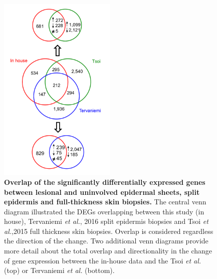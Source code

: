 \begin{figure}[htbp]
\centering
\includegraphics[width=0.5\textwidth]{./Results2/pdfs/skin_transcriptomics_venn_diagrams}
\caption[Overlap of the significantly differentially expressed genes between lesional and uninvolved epidermal sheets, split epidermis and whole skin biopsies.]{\textbf{Overlap of the significantly differentially expressed genes between lesional and uninvolved epidermal sheets, split epidermis and full-thickness skin biopsies.} The central venn diagram illustrated the DEGs overlapping between this study (in house), Tervaniemi \textit{et al.}, 2016 split epidermis biopsies and Tsoi \textit{et al.},2015 full thickness skin biopsies. Overlap is considered regardless the direction of the change. Two additional venn diagrams provide more detail about the total overlap and directionality in the change of gene expression between the in-house data and the Tsoi \textit{et al.} (top) or Tervaniemi \textit{et al.} (bottom).}
\label{figure:Skin_venn_diagrams_comparison_other_studies}
\end{figure}



